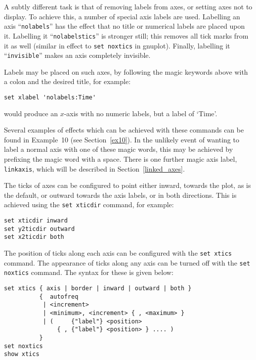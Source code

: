 \documentclass[a4paper,onecolumn,11pt]{book}
\begin{document}
A subtly different task is that of removing labels from axes, or setting axes
not to display. To achieve this, a number of special axis labels are used.
Labelling an axis ``\texttt{nolabels}'' has the effect that no title or numerical
labels are placed upon it. Labelling it\label{nolabelstics}
``\texttt{nolabelstics}'' is stronger still; this removes all tick marks from it as well
(similar in effect to \texttt{set noxtics} in gnuplot). Finally, labelling it
``\texttt{invisible}''
makes an axis completely invisible.

Labels may be placed on such axes, by following the magic keywords above with a
colon and the desired title, for example:

\begin{verbatim}
set xlabel 'nolabels:Time'
\end{verbatim}

\noindent would produce an $x$-axis with no numeric labels, but a label of
`Time'.

Several examples of effects which can be achieved with these commands can be
found in Example~10 (see Section~\ref{ex10}).  In the unlikely event of wanting
to label a normal axis with one of these magic words, this may be achieved by prefixing the magic
word with a space. There is one further magic axis label, \texttt{linkaxis},
which will be described in Section~\ref{linked_axes}.

The ticks of axes can be configured to point either inward, towards the plot,
as is the default, or outward towards the axis labels, or in both directions.
This is achieved using the \texttt{set xticdir} command, for example:

\begin{verbatim}
set xticdir inward
set y2ticdir outward
set x2ticdir both
\end{verbatim}

The position of ticks along each axis can be configured with the \texttt{set
xtics} command. The
appearance of ticks along any axis can be turned off with the \texttt{set
noxtics} command. The
syntax for these is given below:

\begin{verbatim}
set xtics { axis | border | inward | outward | both }
          {  autofreq
           | <increment>
           | <minimum>, <increment> { , <maximum> }
           | (     {"label"} <position>
               { , {"label"} <position> } .... )
          }
set noxtics
show xtics
\end{verbatim}
\end{document}
